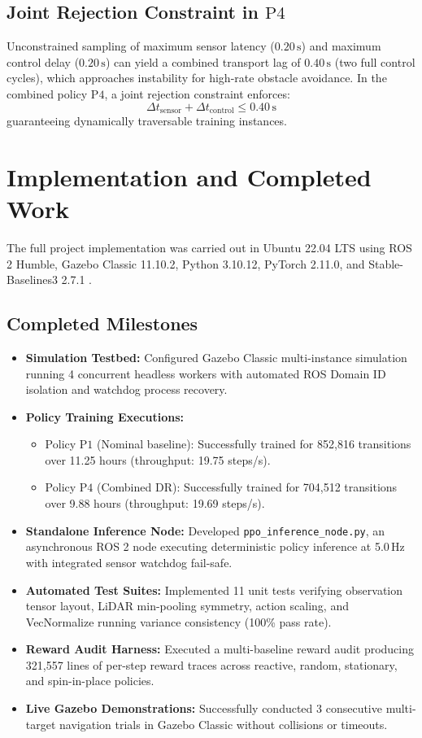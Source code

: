\documentclass[conference]{IEEEtran}
\begin{document}
\subsection{Joint Rejection Constraint in $\text{P4}$}
Unconstrained sampling of maximum sensor latency ($0.20\,\text{s}$) and maximum control delay ($0.20\,\text{s}$) can yield a combined transport lag of $0.40\,\text{s}$ (two full control cycles), which approaches instability for high-rate obstacle avoidance. In the combined policy $\text{P4}$, a joint rejection constraint enforces:
\begin{equation}
\Delta t_{\text{sensor}} + \Delta t_{\text{control}} \le 0.40\,\text{s}
\end{equation}
guaranteeing dynamically traversable training instances.

\section{Implementation and Completed Work}
The full project implementation was carried out in Ubuntu 22.04 LTS using ROS 2 Humble, Gazebo Classic 11.10.2, Python 3.10.12, PyTorch 2.11.0, and Stable-Baselines3 2.7.1 \cite{raffin2021stable}.

\subsection{Completed Milestones}
\begin{itemize}
    \item \textbf{Simulation Testbed:} Configured Gazebo Classic multi-instance simulation running 4 concurrent headless workers with automated ROS Domain ID isolation and watchdog process recovery.
    \item \textbf{Policy Training Executions:}
    \begin{itemize}
        \item Policy $\text{P1}$ (Nominal baseline): Successfully trained for 852,816 transitions over 11.25 hours (throughput: 19.75 steps/s).
        \item Policy $\text{P4}$ (Combined DR): Successfully trained for 704,512 transitions over 9.88 hours (throughput: 19.69 steps/s).
    \end{itemize}
    \item \textbf{Standalone Inference Node:} Developed \texttt{ppo\_inference\_node.py}, an asynchronous ROS 2 node executing deterministic policy inference at 5.0\,Hz with integrated sensor watchdog fail-safe.
    \item \textbf{Automated Test Suites:} Implemented 11 unit tests verifying observation tensor layout, LiDAR min-pooling symmetry, action scaling, and VecNormalize running variance consistency (100\% pass rate).
    \item \textbf{Reward Audit Harness:} Executed a multi-baseline reward audit producing 321,557 lines of per-step reward traces across reactive, random, stationary, and spin-in-place policies.
    \item \textbf{Live Gazebo Demonstrations:} Successfully conducted 3 consecutive multi-target navigation trials in Gazebo Classic without collisions or timeouts.
\end{itemize}
\end{document}
